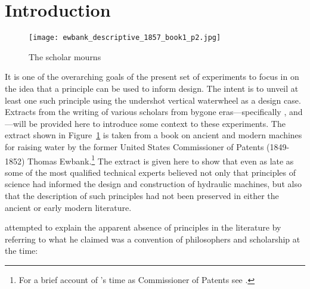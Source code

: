 
\newpage


\section{Introduction}

\begin{figure}[ht!]
    \centering
    \texttt{[image: ewbank\_descriptive\_1857\_book1\_p2.jpg]}
    \caption{The scholar mourns \cite[p.~2]{ewbank_descriptive_1857}}
    \label{fig:ewbank}
\end{figure}

It is one of the overarching goals of the present set of experiments to focus in on the idea that a principle can be used to inform design. The intent is to unveil at least one such principle using the undershot vertical waterwheel as a design case. Extracts from the writing of various scholars from bygone eras---specifically \citeauthor{descartes_principles_1982}, \citeauthor{smeaton_experimental_1759} and \citeauthor{ewbank_descriptive_1857}---will be provided here to introduce some context to these experiments. The extract shown in Figure~\ref{fig:ewbank} is taken from a book on ancient and modern machines for raising water by the former United States Commissioner of Patents (1849-1852) Thomas Ewbank.\footnote{For a brief account of \citeauthor{ewbank_descriptive_1857}'s time as Commissioner of Patents see \cite{bate_thomas_1973}.} The extract is given here to show that even as late as \citeyear{ewbank_descriptive_1857} some of the most qualified technical experts believed not only that principles of science had informed the design and construction of hydraulic machines, but also that the description of such principles had not been preserved in either the ancient or early modern literature. 

\citeauthor{ewbank_descriptive_1857} attempted to explain the apparent absence of principles in the literature by referring to what he claimed was a convention of philosophers and scholarship at the time: 

